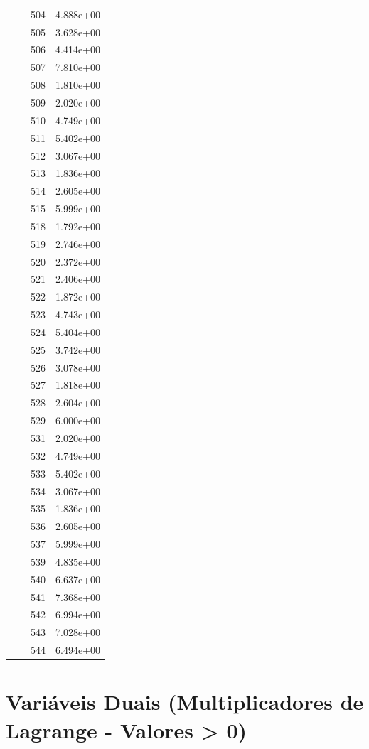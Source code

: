 \documentclass[12pt]{article}
\begin{document}
\begin{longtable}{@{}cccc@{}}
 &  & 504 & 4.888e+00 \\
 &  & 505 & 3.628e+00 \\
 &  & 506 & 4.414e+00 \\
 &  & 507 & 7.810e+00 \\
 &  & 508 & 1.810e+00 \\
 &  & 509 & 2.020e+00 \\
 &  & 510 & 4.749e+00 \\
 &  & 511 & 5.402e+00 \\
 &  & 512 & 3.067e+00 \\
 &  & 513 & 1.836e+00 \\
 &  & 514 & 2.605e+00 \\
 &  & 515 & 5.999e+00 \\
 &  & 518 & 1.792e+00 \\
 &  & 519 & 2.746e+00 \\
 &  & 520 & 2.372e+00 \\
 &  & 521 & 2.406e+00 \\
 &  & 522 & 1.872e+00 \\
 &  & 523 & 4.743e+00 \\
 &  & 524 & 5.404e+00 \\
 &  & 525 & 3.742e+00 \\
 &  & 526 & 3.078e+00 \\
 &  & 527 & 1.818e+00 \\
 &  & 528 & 2.604e+00 \\
 &  & 529 & 6.000e+00 \\
 &  & 531 & 2.020e+00 \\
 &  & 532 & 4.749e+00 \\
 &  & 533 & 5.402e+00 \\
 &  & 534 & 3.067e+00 \\
 &  & 535 & 1.836e+00 \\
 &  & 536 & 2.605e+00 \\
 &  & 537 & 5.999e+00 \\
 &  & 539 & 4.835e+00 \\
 &  & 540 & 6.637e+00 \\
 &  & 541 & 7.368e+00 \\
 &  & 542 & 6.994e+00 \\
 &  & 543 & 7.028e+00 \\
 &  & 544 & 6.494e+00 \\

\bottomrule
\end{longtable}


\section{Variáveis Duais (Multiplicadores de Lagrange - Valores > 0)}
\end{document}
